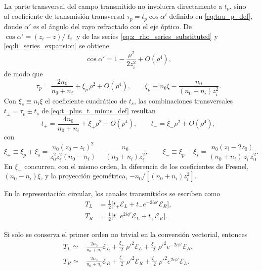 La parte transversal del campo transmitido no involucra directamente a \(t_p\), sino al coeficiente de transmisión transversal \(\tau_p=t_p\cos\alpha'\) definido en \eqref{eq:tau_p_def}, donde \(\alpha'\) es el ángulo del rayo refractado con el eje óptico. De \(\cos\alpha'=(z_i-z)/\ell_i\) y de las series \eqref{eq:z_rho_series_substituted} y \eqref{eq:li_series_expansion} se obtiene
\begin{equation}
\cos\alpha'
=
1-\frac{\rho^2}{2z_i^2}+O(\rho^4),
\label{eq:cos_alpha_prime_series}
\end{equation}
de modo que
\begin{equation}
\tau_p
=
\frac{2n_0}{n_0+n_i}
+
\xi_p\,\rho^2
+
O(\rho^4),
\qquad
\xi_p
\equiv
n_0\xi-\frac{n_0}{(n_0+n_i)z_i^2}.
\label{eq:tau_p_series_second_order}
\end{equation}
Con \(\xi_s\equiv n_i\xi\) el coeficiente cuadrático de \(t_s\), las combinaciones transversales \(t_\pm=\tau_p\pm t_s\) de \eqref{eq:t_plus_t_minus_def} resultan
\begin{equation}
t_+
=
\frac{4n_0}{n_0+n_i}
+
\xi_+\rho^2
+
O(\rho^4),
\qquad
t_-
=
\xi_-\rho^2
+
O(\rho^4),
\label{eq:t_plus_minus_transverse_series}
\end{equation}
con
\begin{equation}
\xi_+
\equiv
\xi_p+\xi_s
=
\frac{n_0(z_0-z_i)^2}{z_0^2z_i^2(n_0-n_i)}
-
\frac{n_0}{(n_0+n_i)z_i^2},
\qquad
\xi_-
\equiv
\xi_p-\xi_s
=
\frac{n_0(z_i-2z_0)}{(n_0+n_i)\,z_i\,z_0^2}.
\label{eq:xi_plus_minus_def}
\end{equation}
En \(\xi_-\) concurren, con el mismo orden, la diferencia de los coeficientes de Fresnel, \((n_0-n_i)\xi\), y la proyección geométrica, \(-n_0/[(n_0+n_i)z_i^2]\).

En la representación circular, los canales transmitidos se escriben como
\begin{align}
T_L
&=
\frac{1}{2}
\big[
t_+\mathscr E_L
+
t_-e^{-2i\phi'}\mathscr E_R
\big],
\label{eq:TL_exact_circular}
\\[6pt]
T_R
&=
\frac{1}{2}
\big[
t_-e^{2i\phi'}\mathscr E_L
+
t_+\mathscr E_R
\big].
\label{eq:TR_exact_circular}
\end{align}

Si solo se conserva el primer orden no trivial en la conversión vectorial, entonces
\begin{align}
T_L
\simeq{}&
\frac{2n_0}{n_0+n_i}\mathscr E_L
+
\frac{\xi_+}{2}\,\rho'^2\mathscr E_L
+
\frac{\xi_-}{2}\,\rho'^2e^{-2i\phi'}\mathscr E_R,
\label{eq:TL_second_order_corrected}
\\[8pt]
T_R
\simeq{}&
\frac{2n_0}{n_0+n_i}\mathscr E_R
+
\frac{\xi_+}{2}\,\rho'^2\mathscr E_R
+
\frac{\xi_-}{2}\,\rho'^2e^{2i\phi'}\mathscr E_L.
\label{eq:TR_second_order_corrected}
\end{align}

